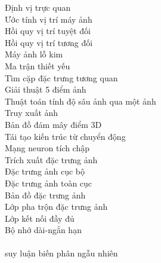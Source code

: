 \begin{keyword}
    		    {Định vị trực quan} 		    \\
    		{Ước tính vị trí máy ảnh} 		\\
    		{Hồi quy vị trí tuyệt đối} 		\\
    		{Hồi quy vị trí tương đối} 		\\
    		        {Máy ảnh lỗ kim} 	        	\\
    		        {Ma trận thiết yếu} 		    \\
    		        {Tìm cặp đặc trưng tương quan} 	\\
    		        {Giải thuật 5 điểm ảnh} 		\\
    	{Thuật toán tính độ sâu ảnh qua một ảnh} 		\\
    		        {Truy xuất ảnh} 	        	\\
    		        {Bản đồ đám mây điểm 3D} 		\\
    		    {Tái tạo kiến trúc từ chuyển động} 	\\
    		{Mạng neuron tích chập} 		\\
    	        {Trích xuất đặc trưng ảnh} 		\\
    		        {Đặc trưng ảnh cục bộ} 	        \\
                 {Đặc trưng ảnh toàn cục}        \\
                       {Bản đồ đặc trưng ảnh}          \\ 
                     {Lớp pha trộn đặc trưng ảnh}    \\ 
             {Lớp kết nối đầy đủ}            \\ 
            {Bộ nhớ dài-ngắn hạn}           \\ 
     \\
      {suy luận biến phân ngẫu nhiên} \\

\end{keyword}

